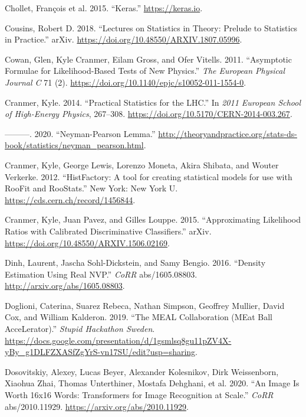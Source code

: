 \documentclass[
  11pt,
  numbers=noendperiod]{book}
\newlength{\cslhangindent}
\newlength{\cslentryspacingunit} %
\newenvironment{CSLReferences}[2] %
 {%
  \setlength{\parindent}{0pt}
  \ifodd #1
  \let\oldpar\par
  \def\par{\hangindent=\cslhangindent\oldpar}
  \fi
  \setlength{\parskip}{#2\cslentryspacingunit}
 }%
 {}
\begin{document}
\begin{CSLReferences}{1}{0}
\leavevmode{}%
Chollet, François et al. 2015. {``Keras.''} \url{https://keras.io}.

\leavevmode{}%
Cousins, Robert D. 2018. {``Lectures on Statistics in Theory: Prelude to
Statistics in Practice.''} arXiv.
\url{https://doi.org/10.48550/ARXIV.1807.05996}.

\leavevmode{}%
Cowan, Glen, Kyle Cranmer, Eilam Gross, and Ofer Vitells. 2011.
{``Asymptotic Formulae for Likelihood-Based Tests of New Physics.''}
\emph{The European Physical Journal C} 71 (2).
\url{https://doi.org/10.1140/epjc/s10052-011-1554-0}.

\leavevmode{}%
Cranmer, Kyle. 2014. {``{Practical Statistics for the LHC}.''} In
\emph{{2011 European School of High-Energy Physics}}, 267--308.
\url{https://doi.org/10.5170/CERN-2014-003.267}.

\leavevmode{}%
---------. 2020. {``Neyman-Pearson Lemma.''}
\url{http://theoryandpractice.org/stats-ds-book/statistics/neyman_pearson.html}.

\leavevmode{}%
Cranmer, Kyle, George Lewis, Lorenzo Moneta, Akira Shibata, and Wouter
Verkerke. 2012. {``{HistFactory: A tool for creating statistical models
for use with RooFit and RooStats}.''} New York: New York U.
\url{https://cds.cern.ch/record/1456844}.

\leavevmode{}%
Cranmer, Kyle, Juan Pavez, and Gilles Louppe. 2015. {``Approximating
Likelihood Ratios with Calibrated Discriminative Classifiers.''} arXiv.
\url{https://doi.org/10.48550/ARXIV.1506.02169}.

\leavevmode{}%
Dinh, Laurent, Jascha Sohl-Dickstein, and Samy Bengio. 2016. {``Density
Estimation Using Real {NVP}.''} \emph{CoRR} abs/1605.08803.
\url{http://arxiv.org/abs/1605.08803}.

\leavevmode{}%
Doglioni, Caterina, Suarez Rebeca, Nathan Simpson, Geoffrey Mullier,
David Cox, and William Kalderon. 2019. {``The MEAL Collaboration (MEat
Ball AcceLerator).''} \emph{Stupid Hackathon Sweden}.
\url{https://docs.google.com/presentation/d/1gsmlsq8gu11pZV4X-yBy_g1DLFZXASfZgYrS-vn17SU/edit?usp=sharing}.

\leavevmode{}%
Dosovitskiy, Alexey, Lucas Beyer, Alexander Kolesnikov, Dirk
Weissenborn, Xiaohua Zhai, Thomas Unterthiner, Mostafa Dehghani, et al.
2020. {``An Image Is Worth 16x16 Words: Transformers for Image
Recognition at Scale.''} \emph{CoRR} abs/2010.11929.
\url{https://arxiv.org/abs/2010.11929}.


\end{CSLReferences}
\end{document}
